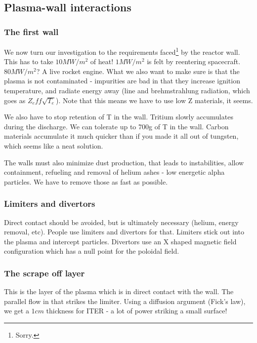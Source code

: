 \documentclass[PlasmaNotes.tex]{subfiles}
\begin{document}
\subsection{Plasma-wall interactions}

\subsubsection{The first wall}

We now turn our investigation to the requirements faced\footnote{Sorry.} by the reactor wall. This has to take $10MW/m^2$ of heat! $1MW/m^2$ is felt by reentering spacecraft. $80MW/m^2$? A live rocket engine. What we also want to make sure is that the plasma is not contaminated - impurities are bad in that they increase ignition temperature, and radiate energy away (line and brehmstrahlung radiation, which goes as $Z_eff \sqrt{T_e}$). Note that this means we have to use low Z materials, it seems.

We also have to stop retention of T in the wall. Tritium slowly accumulates during the discharge. We can tolerate up to 700g of T in the wall. Carbon materials accumulate it much quicker than if you made it all out of tungsten, which seems like a neat solution.

The walls must also minimize dust production, that leads to instabilities, allow containment, refueling and removal of helium ashes - low energetic alpha particles. We have to remove those as fast as possible.

\subsubsection{Limiters and divertors}

Direct contact should be avoided, but is ultimately necessary (helium, energy removal, etc). People use limiters and divertors for that. Limiters stick out into the plasma and intercept particles. Divertors use an X shaped magnetic field configuration which has a null point for the poloidal field.

\subsubsection{The scrape off layer}

This is the layer of the plasma which is in direct contact with the wall. The parallel flow in that strikes the limiter. Using a diffusion argument (Fick's law), we get a $1cm$ thickness for ITER - a lot of power striking a small surface! 
\end{document}

